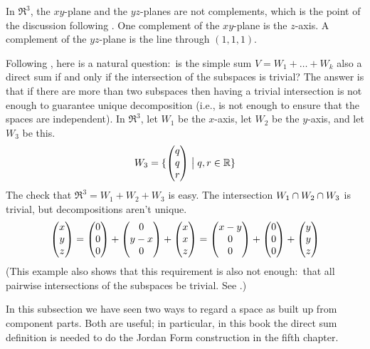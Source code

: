 \begin{example}
In \( \Re^3 \), the \( xy \)-plane and the \( yz \)-planes are not
complements, which is the point of the discussion following
.
One complement of the \( xy \)-plane is the \( z \)-axis.
A complement of the \( yz \)-plane is the line through \( (1,1,1) \).
\end{example}

\begin{example}    \label{exam:DirSumThree}
Following , here is a natural question:~is
the simple sum $V=W_1+\dots+W_k$ also a direct sum if and only if
the intersection of the subspaces is trivial?
The answer is that if there are more than two subspaces then 
having a trivial intersection is not enough to 
guarantee unique decomposition (i.e., is not enough to ensure that the
spaces are independent). 
In \( \Re^3 \), let
\( W_1 \) be the \( x \)-axis, let \( W_2 \) be the \( y \)-axis, and let
$W_3$ be this.
\begin{equation*}
  W_3=\mbox{$\{\begin{pmatrix} q \\ q \\ r \end{pmatrix} \bigm| q,r\in\mathbb{R}\}$}
\end{equation*}
The check that \( \Re^3=W_1+W_2+W_3 \) is easy.
The intersection 
\( W_1\cap W_2\cap W_3 \) 
is trivial, but decompositions aren't unique.
\begin{equation*}
  \begin{pmatrix} x \\ y \\ z \end{pmatrix}
  =\begin{pmatrix} 0 \\ 0 \\ 0 \end{pmatrix}
  +\begin{pmatrix} 0 \\ y-x \\ 0 \end{pmatrix}
  +\begin{pmatrix} x \\ x \\ z \end{pmatrix}
  =\begin{pmatrix} x-y \\ 0 \\ 0 \end{pmatrix}
  +\begin{pmatrix} 0 \\ 0 \\ 0 \end{pmatrix}
  +\begin{pmatrix} y \\ y \\ z \end{pmatrix}
\end{equation*}
(This example also shows that this requirement is also not 
enough:~that all pairwise intersections of the subspaces be trivial.
See .)
\end{example}

In this subsection we have seen two ways to regard a space as built up from
component parts.
Both are useful; in particular, in this book the direct sum definition is
needed to do the Jordan Form construction in the fifth chapter.

